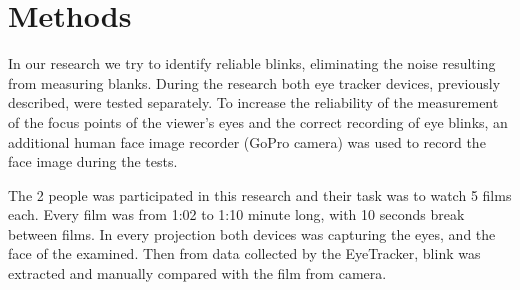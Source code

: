 \documentclass[conference]{IEEEtran}
\begin{document}
\section{Methods}
In our research we try to identify reliable blinks, eliminating the noise resulting from measuring blanks. During the research both eye tracker devices, previously described, were tested separately. To increase the reliability of the measurement of the focus points of the viewer's eyes and the correct recording of eye blinks, an additional human face image recorder (GoPro camera) was used to record the face image during the tests. 
\par The 2 people was participated in this research and their task was to watch 5 films each. Every film was from 1:02 to 1:10 minute long, with 10 seconds break between films. In every projection both devices was capturing the eyes, and the face of the examined. Then from data collected by the EyeTracker, blink was extracted and manually compared with the film from camera.
\end{document}
